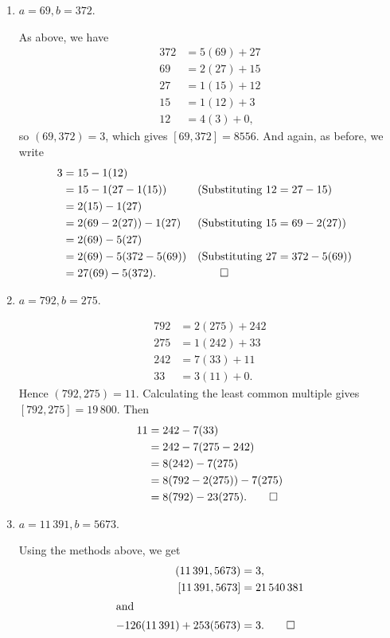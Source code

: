 \begin{enumerate}
\item
  $a = 69, b = 372$.
  \begin{solution}
    As above, we have
    \begin{align*}
      372 &= 5(69) + 27 \\
      69 &= 2(27) + 15 \\
      27 &= 1(15) + 12 \\
      15 &= 1(12) + 3 \\
      12 &= 4(3) + 0,
    \end{align*}
    so $(69, 372) = 3$, which gives $[69, 372] = 8556$. And again, as
    before, we write
    \begin{align*}
      3 &= 15 - 1(12) \\
        &= 15 - 1(27 - 1(15)) && \text{(Substituting $12 = 27 - 15$)} \\
        &= 2(15) - 1(27) \\
        &= 2(69 - 2(27)) - 1(27) && \text{(Substituting $15 = 69 - 2(27)$)} \\
        &= 2(69) - 5(27) \\
        &= 2(69) - 5(372 - 5(69)) && \text{(Substituting $27 = 372 - 5(69)$)} \\
        &= 27(69) - 5(372). && \qedhere
    \end{align*}
  \end{solution}

\item
  $a = 792, b = 275$.
  \begin{solution}
    \begin{align*}
      792 &= 2(275) + 242 \\
      275 &= 1(242) + 33 \\
      242 &= 7(33) + 11 \\
      33 &= 3(11) + 0.
    \end{align*}
    Hence $(792, 275) = 11$. Calculating the least common multiple
    gives $[792, 275] = 19\,800$. Then
    \begin{align*}
      11 &= 242 - 7(33) \\
         &= 242 - 7(275 - 242) \\
         &= 8(242) - 7(275) \\
         &= 8(792 - 2(275)) - 7(275) \\
         &= 8(792) - 23(275). \qedhere
    \end{align*}
  \end{solution}

\item
  $a = 11\,391, b = 5673$.
  \begin{solution}
    Using the methods above, we get
    \begin{align*}
      (11\,391, 5673) &= 3, \\
      [11\,391, 5673] &= 21\,540\,381 \\
      \intertext{and}
      -126(11\,391) + 253(5673) &= 3. \qedhere
    \end{align*}
  \end{solution}


\end{enumerate}
